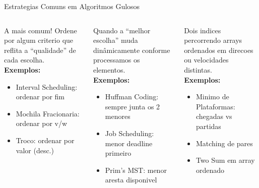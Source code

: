 \documentclass[aspectratio=169,10pt]{beamer}
\begin{document}
\begin{frame}[shrink=2]{Estrategias Comuns em Algoritmos Gulosos}
  \begin{columns}[t]
      \begin{tcolorbox}[caixaDourada,title={1. Ordenar e Varrer}]
        \footnotesize
        A mais comum! Ordene por algum criterio
        que reflita a ``qualidade'' de cada escolha.\\[3pt]
        \textbf{Exemplos:}
        \begin{itemize}\footnotesize
          \item Interval Scheduling: ordenar por fim
          \item Mochila Fracionaria: ordenar por v/w
          \item Troco: ordenar por valor (desc.)
        \end{itemize}
      \end{tcolorbox}
      \vspace{0.1cm}
      \begin{tcolorbox}[caixaRoxa,title={2. Priority Queue (Heap)}]
        \footnotesize
        Quando a ``melhor escolha'' muda dinâmicamente
        conforme processamos os elementos.\\[3pt]
        \textbf{Exemplos:}
        \begin{itemize}\footnotesize
          \item Huffman Coding: sempre junta os 2 menores
          \item Job Scheduling: menor deadline primeiro
          \item Prim's MST: menor aresta disponivel
        \end{itemize}
      \end{tcolorbox}
      \begin{tcolorbox}[caixaVerde,title={3. Dois Ponteiros}]
        \footnotesize
        Dois indices percorrendo arrays ordenados
        em direcoes ou velocidades distintas.\\[3pt]
        \textbf{Exemplos:}
        \begin{itemize}\footnotesize
          \item Minimo de Plataformas: chegadas vs partidas
          \item Matching de pares
          \item Two Sum em array ordenado
        \end{itemize}
      \end{tcolorbox}

\end{columns}
\end{frame}
\end{document}
